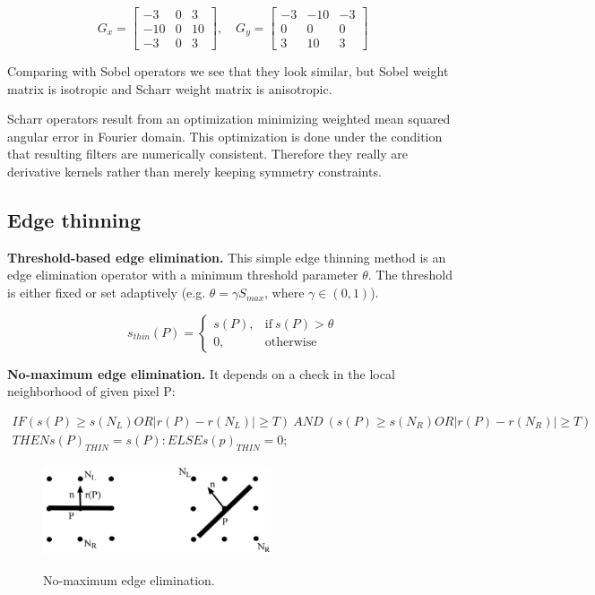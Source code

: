 \documentclass[letterpaper,12pt]{article}
\begin{document}
\[	
  	G_x = \begin{bmatrix}
  	-3 & 0 & 3 \\
  	-10 & 0 & 10 \\
  	-3 & 0 & 3
	\end{bmatrix}, \quad
	G_y = \begin{bmatrix}
  	-3 & -10 & -3 \\
  	0 & 0 & 0 \\
  	3 & 10 & 3
	\end{bmatrix}
\]

Comparing with Sobel operators we see that they look similar, but Sobel weight matrix is isotropic and Scharr weight matrix is anisotropic.
					
Scharr operators result from an optimization minimizing weighted mean squared angular error in Fourier domain. This optimization is done under the condition that resulting filters are numerically consistent. Therefore they really are derivative kernels rather than merely keeping symmetry constraints.


\subsection{Edge thinning}

\textbf{Threshold-based edge elimination.} This simple edge thinning method is an edge elimination operator with a minimum threshold parameter $\theta$. The threshold is either fixed or set adaptively (e.g. $\theta = \gamma S_{max}$, where $ \gamma \in(0,1)$).

\begin{equation}
s_{thin}(P) = \begin{cases}
	s(P), & \text{if}\ s(P) > \theta	\\
	0, & \text{otherwise}
\end{cases}
\label{ncc}
\end{equation}

\textbf{No-maximum edge elimination.} It depends on a check in the local neighborhood of given pixel P:

\begin{gather}
	IF(s(P)\geq s(N_L) OR |r(P)-r(N_L)|\geq T)\
	AND\ (s(P)\geq s(N_R)OR |r(P)-r(N_R)|\geq T)\\
	THEN s(P)_{THIN}=s(P):
	ELSE s(p)_{THIN}=0;
\end{gather}

\begin{figure}[!th]
  \centering
  {\includegraphics[width=0.6\textwidth]{edge_thin_neghb}\label{fig:edge_thin_n}}
    \caption{No-maximum edge elimination.}
  \end{figure}
\end{document}
